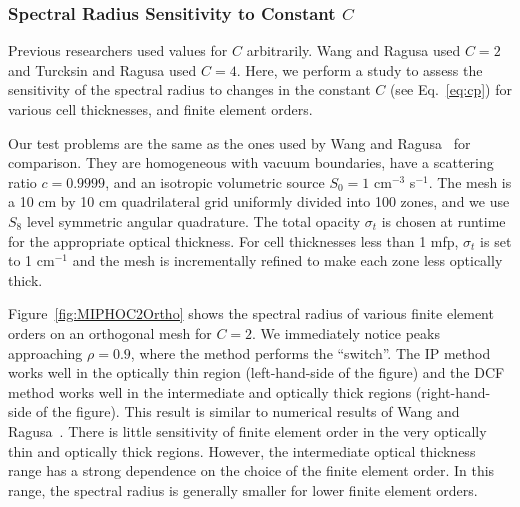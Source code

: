 \documentclass[12pt]{article}
\begin{document}
\subsubsection{Spectral Radius Sensitivity to Constant $C$}
Previous researchers used values for $C$ arbitrarily. Wang and Ragusa \cite{WangRagusaDSA} used $C = 2$ and Turcksin and Ragusa \cite{TurcksinDiscontinuousDSA} used $C = 4$. Here, we perform a study to assess the sensitivity of the spectral radius to changes in the constant $C$ (see Eq.~\ref{eq:cp}) for various cell thicknesses, and finite element orders. 

Our test problems are the same as the ones used by Wang and Ragusa~\cite{WangRagusaDSA} for comparison. They are homogeneous with vacuum boundaries, have a scattering ratio $c=0.9999$, and an isotropic volumetric source $S_0 = 1$ cm$^{-3}$ s$^{-1}$. The mesh is a 10 cm by 10 cm quadrilateral grid uniformly divided into 100 zones, and we use $S_8$ level symmetric angular quadrature.  The total opacity $\sigma_t$ is chosen at runtime for the appropriate optical thickness. For cell thicknesses less than 1 mfp, $\sigma_t$ is set to 1 cm$^{-1}$ and the mesh is incrementally refined to make each zone less optically thick.

Figure~\ref{fig:MIPHOC2Ortho} shows the spectral radius of various finite element orders on an orthogonal mesh for $C=2$. We immediately notice peaks approaching $\rho = 0.9$, where the method performs the ``switch''. The IP method works well in the optically thin region (left-hand-side of the figure) and the DCF method works well in the intermediate and optically thick regions (right-hand-side of the figure). This result is similar to numerical results of Wang and Ragusa~\cite{WangRagusaDSA}. There is little sensitivity of finite element order in the very optically thin and optically thick regions. However, the intermediate optical thickness range has a strong dependence on the choice of the finite element order. In this range, the spectral radius is generally smaller for lower finite element orders.
\end{document}
